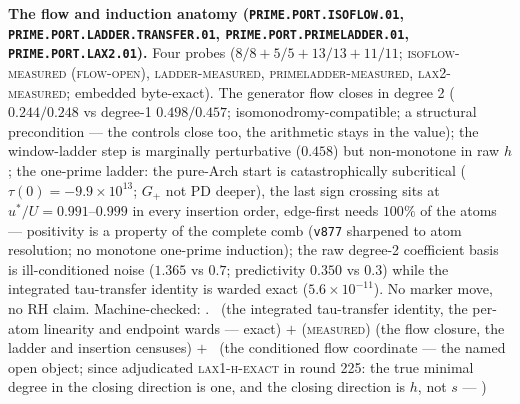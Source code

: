 \par\smallskip\noindent\textbf{The flow and induction anatomy
(\texttt{PRIME.PORT.\allowbreak ISOFLOW.01},
\texttt{PRIME.PORT.LADDER.\allowbreak TRANSFER.01},
\texttt{PRIME.PORT.\allowbreak PRIMELADDER.01},
\texttt{PRIME.PORT.\allowbreak LAX2.01}).}
Four probes ($8/8 + 5/5 + 13/13 + 11/11$;
\textsc{isoflow-measured (flow-open)}, \textsc{ladder-measured},
\textsc{primeladder-measured}, \textsc{lax2-measured}; embedded
byte-exact).  The generator flow closes in degree 2
($0.244/0.248$ vs degree-1 $0.498/0.457$;
isomonodromy-compatible; a structural precondition --- the
controls close too, the arithmetic stays in the value); the
window-ladder step is marginally perturbative ($0.458$) but
non-monotone in raw $h$; the one-prime ladder: the pure-Arch
start is catastrophically subcritical ($\tau(0) =
-9.9\times10^{13}$; $G_+$ not PD deeper), the last sign crossing
sits at $u^{*}/U = 0.991$--$0.999$ in every insertion order,
edge-first needs $100\%$ of the atoms --- positivity is a
property of the complete comb (\texttt{v877} sharpened to atom
resolution; no monotone one-prime induction); the raw degree-2
coefficient basis is ill-conditioned noise ($1.365$ vs $0.7$;
predictivity $0.350$ vs $0.3$) while the integrated tau-transfer
identity is warded exact ($5.6\times10^{-11}$).  No marker move,
no RH claim.
Machine-checked: .
\mE\ (the integrated tau-transfer identity, the per-atom
linearity and endpoint wards --- exact) $+$ (\textsc{measured})
(the flow closure, the ladder and insertion censuses) $+$ \mO\
(the conditioned flow coordinate --- the named open object;
since adjudicated \textsc{lax1-h-exact} in round 225: the true
minimal degree in the closing direction is one, and the closing
direction is $h$, not $s$ ---
)
\par\smallskip


